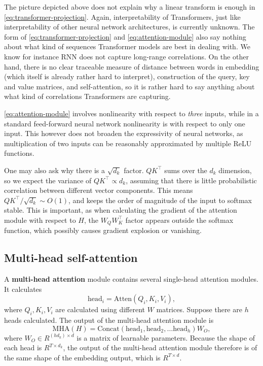 \documentclass[hyperref, a4paper, 12pt]{report}
\newcommand*{\concept}[1]{{\textbf{#1}}}
\def\mathbb#1{#1}%
\begin{document}
The picture depicted above does not explain why a linear transform is enough in \eqref{eq:transformer-projection}.
Again, interpretability of Transformers, just like interpretability of other neural network architectures,
is currently unknown.
The form of \eqref{eq:transformer-projection} and \eqref{eq:attention-module} also say nothing 
about what kind of sequences Transformer models are best in dealing with.
We know for instance RNN does not capture long-range correlations.
On the other hand, there is no clear traceable measure of distance between words 
in embedding (which itself is already rather hard to interpret),
construction of the query, key and value matrices, and self-attention,
so it is rather hard to say anything about what kind of correlations Transformers are capturing.

\eqref{eq:attention-module} involves nonlinearity with respect to \emph{three} inputs,
while in a standard feed-forward neural network nonlinearity is with respect to only one input.
This however does not broaden the expressivity of neural networks, 
as multiplication of two inputs can be reasonably approximated by multiple ReLU functions.

One may also ask why there is a $\sqrt{d_k}$ factor.
$Q K^\top$ sums over the $d_k$ dimension,
so we expect the variance of $Q K^\top \propto d_k$,
assuming that there is little probabilistic correlation between different vector components.
This means $Q K^\top / \sqrt{d_k} \sim O(1)$,
and keeps the order of magnitude of the input to softmax stable.
This is important, as when calculating the gradient of the attention module with respect to $H$,
the $ W_Q W_K^\top$ factor appears outside the softmax function,
which possibly causes gradient explosion or vanishing.

\subsection{Multi-head self-attention}

A \concept{multi-head attention} module contains several single-head attention modules.
It calculates 
\begin{equation}
    \mathrm{head}_i = \mathrm{Atten}(Q_i, K_i, V_i),
    \label{eq:attention-multihead}
\end{equation}
where $Q_i, K_i, V_i$ are calculated using different $W$ matrices.
Suppose there are $h$ heads calculated.
The output of the multi-head attention module is 
\begin{equation}
    \mathrm{MHA}(H) = \mathrm{Concat}(\mathrm{head}_1, \mathrm{head}_2, \dots \mathrm{head}_h) W_O,
\end{equation}
where $W_O \in \mathbb{R}^{(hd_k) \times d}$ is a matrix of learnable parameters.
Because the shape of each head is $\mathbb{R}^{T \times d_k}$,
the output of the multi-head attention module therefore is of the same shape of the embedding output, which is $\mathbb{R}^{T \times d}$.
\end{document}
